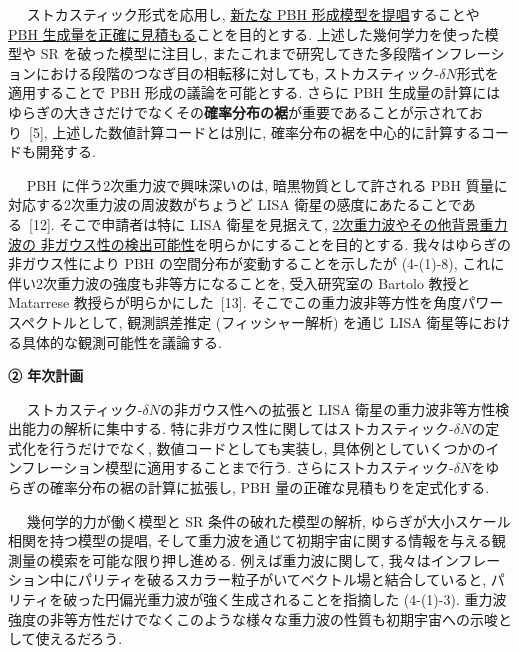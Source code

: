 \documentclass[11pt,a4paper,uplatex,twoside,dvipdfmx]{ujarticle} 	%
\renewcommand{\emph}[1]{{\sffamily\gtfamily\bfseries #1}}
\newcommand{\subject}[1]{\noindent{\sffamily\gtfamily\bfseries #1}~~}
\newcommand{\研究課題名}{\mgfamily ストカスティック形式、原始ブラックホール、重力波観測から迫るインフレーション}
\newcommand{\研究機関名}{\mgfamily 名古屋大学}
\newcommand{\申請者氏名}{\mgfamily 多田 祐一郎}
\newcommand{\研究代表者氏名}{\申請者氏名}
\newcommand{\研究期間の最終元号年度}{34}	%
\begin{document}
{	
	\vspace{3pt}
	\subject{2. PBH}
	ストカスティック形式を応用し, \ul{新たな PBH 形成模型を提唱}することや \ul{PBH 生成量を正確に見積もる}ことを目的とする.
	上述した幾何学力を使った模型や SR を破った模型に注目し,
	またこれまで研究してきた多段階インフレーションにおける段階のつなぎ目の相転移に対しても, 
	ストカスティック-$\delta N$形式を適用することで PBH 形成の議論を可能とする.
	さらに PBH 生成量の計算にはゆらぎの大きさだけでなくその\emph{確率分布の裾}が重要であることが示されており~[5],
	上述した数値計算コードとは別に, 確率分布の裾を中心的に計算するコードも開発する.
	
	
	\vspace{3pt}
	\subject{3. 重力波}
	PBH に伴う2次重力波で興味深いのは, 暗黒物質として許される PBH 質量に対応する2次重力波の周波数がちょうど LISA 衛星の感度にあたることである~[12].
	そこで申請者は特に LISA 衛星を見据えて, \ul{2次重力波やその他背景重力波の
	非ガウス性の検出可能性}を明らかにすることを目的とする.
	我々はゆらぎの非ガウス性により PBH の空間分布が変動することを示したが (4-(1)-8),
	これに伴い2次重力波の強度も非等方になることを, 受入研究室の Bartolo 教授と Matarrese 教授らが明らかにした~[13].
	そこでこの重力波非等方性を角度パワースペクトルとして,
	観測誤差推定 (フィッシャー解析) を通じ LISA 衛星等における具体的な観測可能性を議論する.
	
	
	
	
	
	\begin{mdframed}[roundcorner=0.5zw,
	innertopmargin=0.8zw,innerbottommargin=0.8zw,
	linecolor=black!50,linewidth=0.2zw,
	backgroundcolor=black!10]
	{\bfseries\gtfamily\sffamily\large ② 年次計画}
	\end{mdframed}
	
	\vspace{-10pt}
	\subject{1年目}
	ストカスティック-$\delta N$の非ガウス性への拡張と LISA 衛星の重力波非等方性検出能力の解析に集中する.
	特に非ガウス性に関してはストカスティック-$\delta N$の定式化を行うだけでなく, 数値コードとしても実装し,
	具体例としていくつかのインフレーション模型に適用することまで行う.
	さらにストカスティック-$\delta N$をゆらぎの確率分布の裾の計算に拡張し, PBH 量の正確な見積もりを定式化する.
		
	
	\vspace{3pt}
	\subject{2年目}
	幾何学的力が働く模型と SR 条件の破れた模型の解析,
	ゆらぎが大小スケール相関を持つ模型の提唱, そして重力波を通じて初期宇宙に関する情報を与える観測量の模索を可能な限り押し進める.
	例えば重力波に関して, 我々はインフレーション中にパリティを破るスカラー粒子がいてベクトル場と結合していると, パリティを破った円偏光重力波が強く生成されることを指摘した (4-(1)-3).
	重力波強度の非等方性だけでなくこのような様々な重力波の性質も初期宇宙への示唆として使えるだろう.
	
}
\end{document}
